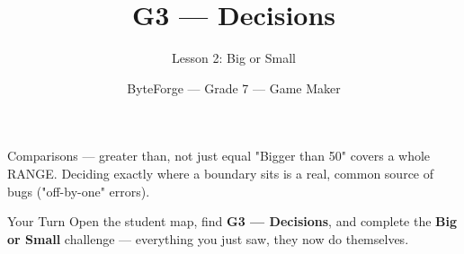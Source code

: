 \documentclass[aspectratio=169]{beamer}
\title{G3 — Decisions}
\subtitle{Lesson 2: Big or Small}
\author{ByteForge --- Grade 7 --- Game Maker}
\date{}
\begin{document}
\begin{frame}
    \titlepage
\end{frame}

\begin{frame}{Comparisons — greater than, not just equal}
    \Large
    "Bigger than 50" covers a whole RANGE. Deciding exactly where a boundary sits is a real, common source of bugs ("off-by-one" errors).
\end{frame}

\begin{frame}{Your Turn}
    \Large
    Open the student map, find \textbf{G3 — Decisions}, and complete
    the \textbf{Big or Small} challenge --- everything you just saw, they now do themselves.
\end{frame}
\end{document}
